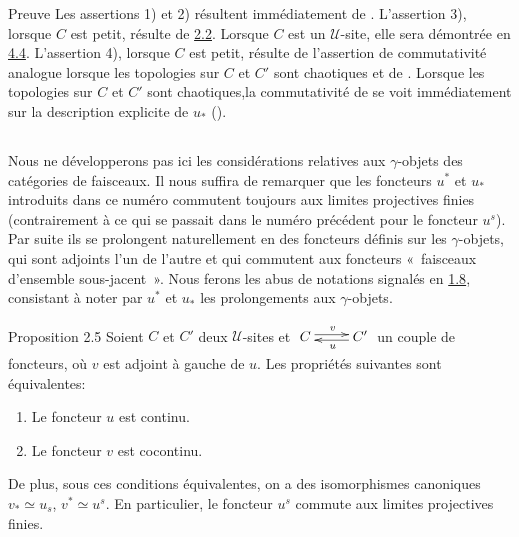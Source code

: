 \documentclass[10pt]{../fichiers-configuration-latex/smfart}
\begin{document}
\begin{enonce*}[remark]{Preuve}
Les assertions 1) et 2) résultent immédiatement de .
L'assertion 3), lorsque $C$ est petit, résulte de \hyperref[III.prop2.2]{2.2}.
Lorsque $C$ est un $𝒰$-site, elle sera démontrée en
\hyperref[III.subsec4.4]{4.4}. L'assertion 4), lorsque $C$ est petit, résulte
de l'assertion de commutativité analogue lorsque les topologies sur
$C$ et $C'$ sont chaotiques et de . Lorsque les
topologies sur $C$ et $C'$ sont chaotiques,\pageoriginale la
commutativité de  se voit immédiatement sur la
description explicite de $u_{\ast}$ ().
\end{enonce*}

\setcounter{subsection}{3}
\subsection{}
Nous ne développerons pas ici les considérations relatives aux
$\gamma$-objets des catégories de faisceaux. Il nous suffira de
remarquer que les foncteurs $u^{\ast}$ et $u_{\ast}$ introduits dans
ce numéro commutent toujours aux limites projectives finies
(contrairement à ce qui se passait dans le numéro précédent pour le
foncteur $u^s$). Par suite ils se prolongent naturellement en des
foncteurs définis sur les $\gamma$-objets, qui sont adjoints l'un de
l'autre et qui commutent aux foncteurs « faisceaux d'ensemble
sous-jacent ». Nous ferons les abus de notations signalés en
\hyperref[III.not1.8]{1.8}, consistant à noter par $u^{\ast}$ et $u_{\ast}$
les prolongements aux $\gamma$-objets.

\begin{enonce*}{Proposition 2.5}
Soient $C$ et $C'$ deux $𝒰$-sites et $\xymatrix{ C
\ar@<2pt>[r]^{v}& C'\ar@<2pt>[l]^{u} }$ un couple de foncteurs, où
$v$ est adjoint à gauche de $u$. Les propriétés suivantes
sont équivalentes:
\begin{enumerate}
\renewcommand{\theenumi}{\roman{enumi}}
\renewcommand{\labelenumi}{\theenumi)}
\item Le foncteur $u$ est continu.

\item Le foncteur $v$ est cocontinu.
\end{enumerate}
De plus, sous ces conditions équivalentes, on a des
isomorphismes canoniques $v_{\ast}\simeq u_{s}$, $v^{\ast}\simeq
u^s$. En particulier, le foncteur $u^s$ commute aux limites
projectives finies.
\end{enonce*}
\end{document}
